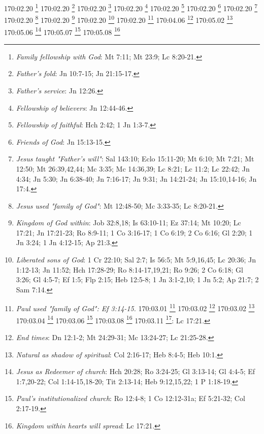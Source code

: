 {{{{{{{{{{{{{{{{{{{{{{{{{{{{{{{{{{{{{{{{{{{{{{{{{{170:02.20 \footnote{\textit{Family fellowship with God}: Mt 7:11; Mt 23:9; Lc 8:20-21.}
170:02.20 \footnote{\textit{Father's fold}: Jn 10:7-15; Jn 21:15-17.}
170:02.20 \footnote{\textit{Father's service}: Jn 12:26.}
170:02.20 \footnote{\textit{Fellowship of believers}: Jn 12:44-46.}
170:02.20 \footnote{\textit{Fellowship of faithful}: Hch 2:42; 1 Jn 1:3-7.}
170:02.20 \footnote{\textit{Friends of God}: Jn 15:13-15.}
170:02.20 \footnote{\textit{Jesus taught "Father's will"}: Sal 143:10; Eclo 15:11-20; Mt 6:10; Mt 7:21; Mt 12:50; Mt 26:39,42,44; Mc 3:35; Mc 14:36,39; Lc 8:21; Lc 11:2; Lc 22:42; Jn 4:34; Jn 5:30; Jn 6:38-40; Jn 7:16-17; Jn 9:31; Jn 14:21-24; Jn 15:10,14-16; Jn 17:4.}
170:02.20 \footnote{\textit{Jesus used "family of God"}: Mt 12:48-50; Mc 3:33-35; Lc 8:20-21.}
170:02.20 \footnote{\textit{Kingdom of God within}: Job 32:8,18; Is 63:10-11; Ez 37:14; Mt 10:20; Lc 17:21; Jn 17:21-23; Ro 8:9-11; 1 Co 3:16-17; 1 Co 6:19; 2 Co 6:16; Gl 2:20; 1 Jn 3:24; 1 Jn 4:12-15; Ap 21:3.}
170:02.20 \footnote{\textit{Liberated sons of God}: 1 Cr 22:10; Sal 2:7; Is 56:5; Mt 5:9,16,45; Lc 20:36; Jn 1:12-13; Jn 11:52; Hch 17:28-29; Ro 8:14-17,19,21; Ro 9:26; 2 Co 6:18; Gl 3:26; Gl 4:5-7; Ef 1:5; Flp 2:15; Heb 12:5-8; 1 Jn 3:1-2,10; 1 Jn 5:2; Ap 21:7; 2 Sam 7:14.}
170:02.20 \footnote{\textit{Paul used "family of God": Ef 3:14-15.}
170:03.01 \footnote{\textit{Righteousness by faith}: Mt 5:20.}
170:03.02 \footnote{\textit{Also need righteousness}: Mt 5:6,20,33; Hch 10:35; Stg 2:14-26.}
170:03.02 \footnote{\textit{Simple childlike belief}: Mt 18:2-6; Mt 19:13-14; Mc 9:36-37; Mc 10:13-15; Lc 9:47-48; Lc 18:16-17.}
170:03.04 \footnote{\textit{We are forgiven as we forgive}: Eclo 28:1-6; Mt 6:12,14-15; Mt 18:21-35; Mc 11:25-26; Lc 6:37b; Lc 11:4a; Lc 17:3-4; Ef 4:32; 1 Jn 2:12.}
170:03.06 \footnote{\textit{Love thy neighbor}: Lv 19:18,34; Mt 5:43-44; Mt 19:19b; Mt 22:39; Mc 12:31,33; Lc 10:27; Ro 13:9b; Gl 5:14; Stg 2:8.}
170:03.08 \footnote{\textit{Loving service}: Mt 20:26-27; Mt 23:11; Mc 9:35; Mc 10:43-45; Lc 22:26.}
170:03.11 \footnote{\textit{New view}: kingdom within}: Lc 17:21.}
170:04.06 \footnote{\textit{End times}: Dn 12:1-2; Mt 24:29-31; Mc 13:24-27; Lc 21:25-28.}
170:05.02 \footnote{\textit{Natural as shadow of spiritual}: Col 2:16-17; Heb 8:4-5; Heb 10:1.}
170:05.06 \footnote{\textit{Jesus as Redeemer of church}: Hch 20:28; Ro 3:24-25; Gl 3:13-14; Gl 4:4-5; Ef 1:7,20-22; Col 1:14-15,18-20; Tit 2:13-14; Heb 9:12,15,22; 1 P 1:18-19.}
170:05.07 \footnote{\textit{Paul's institutionalized church}: Ro 12:4-8; 1 Co 12:12-31a; Ef 5:21-32; Col 2:17-19.}
170:05.08 \footnote{\textit{Kingdom within hearts will spread}: Lc 17:21.}
}}}}}}}}}}}}}}}}}}}}}}}}}}}}}}}}}}}}}}}}}}}}}}}}}}
